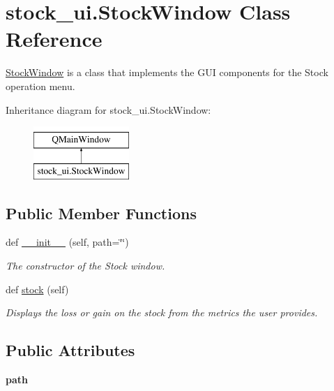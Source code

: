 \hypertarget{classstock__ui_1_1_stock_window}{}\section{stock\+\_\+ui.\+Stock\+Window Class Reference}
\label{classstock__ui_1_1_stock_window}


\hyperlink{classstock__ui_1_1_stock_window}{Stock\+Window} is a class that implements the G\+UI components for the Stock operation menu.  


Inheritance diagram for stock\+\_\+ui.\+Stock\+Window\+:\begin{figure}[H]
\begin{center}
\leavevmode
\includegraphics[height=2.000000cm]{classstock__ui_1_1_stock_window}
\end{center}
\end{figure}
\subsection*{Public Member Functions}
\begin{DoxyCompactItemize}
\item 
def \hyperlink{classstock__ui_1_1_stock_window_a7347eaa350a1387847c614c65ef35718}{\+\_\+\+\_\+init\+\_\+\+\_\+} (self, path=\char`\"{}\char`\"{})
\begin{DoxyCompactList}\small\item\em The constructor of the Stock window. \end{DoxyCompactList}\item 
def \hyperlink{classstock__ui_1_1_stock_window_a81a932663d0fdf4674729367ce8f5d4e}{stock} (self)
\begin{DoxyCompactList}\small\item\em Displays the loss or gain on the stock from the metrics the user provides. \end{DoxyCompactList}\end{DoxyCompactItemize}
\subsection*{Public Attributes}
\begin{DoxyCompactItemize}
\item 
\mbox{\label{classstock__ui_1_1_stock_window_a799b895206dbff001bcc12929d0af1ce}} 
{\bfseries path}
\end{DoxyCompactItemize}


